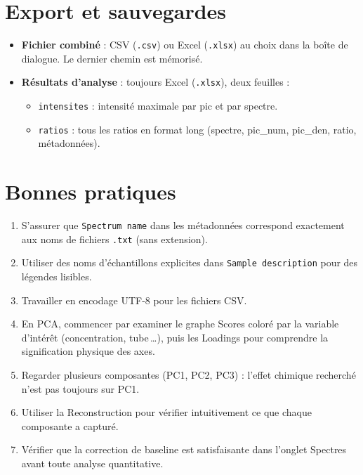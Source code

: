 \documentclass[12pt, a4paper]{article}
\begin{document}
\section{Export et sauvegardes}

\begin{itemize}
  \item \textbf{Fichier combiné} : CSV (\texttt{.csv}) ou Excel
        (\texttt{.xlsx}) au choix dans la boîte de dialogue. Le dernier
        chemin est mémorisé.
  \item \textbf{Résultats d'analyse} : toujours Excel (\texttt{.xlsx}),
        deux feuilles :
    \begin{itemize}
      \item \texttt{intensites} : intensité maximale par pic et par spectre.
      \item \texttt{ratios} : tous les ratios en format long
            (spectre, pic\_num, pic\_den, ratio, métadonnées).
    \end{itemize}
\end{itemize}

\section{Bonnes pratiques}

\begin{enumerate}
  \item S'assurer que \texttt{Spectrum name} dans les métadonnées correspond
        exactement aux noms de fichiers \texttt{.txt} (sans extension).
  \item Utiliser des noms d'échantillons explicites dans \texttt{Sample
        description} pour des légendes lisibles.
  \item Travailler en encodage UTF-8 pour les fichiers CSV.
  \item En PCA, commencer par examiner le graphe Scores coloré par la variable
        d'intérêt (concentration, tube\,\ldots), puis les Loadings pour
        comprendre la signification physique des axes.
  \item Regarder plusieurs composantes (PC1, PC2, PC3) : l'effet chimique
        recherché n'est pas toujours sur PC1.
  \item Utiliser la Reconstruction pour vérifier intuitivement ce que chaque
        composante a capturé.
  \item Vérifier que la correction de baseline est satisfaisante dans
        l'onglet Spectres avant toute analyse quantitative.
\end{enumerate}
\end{document}
